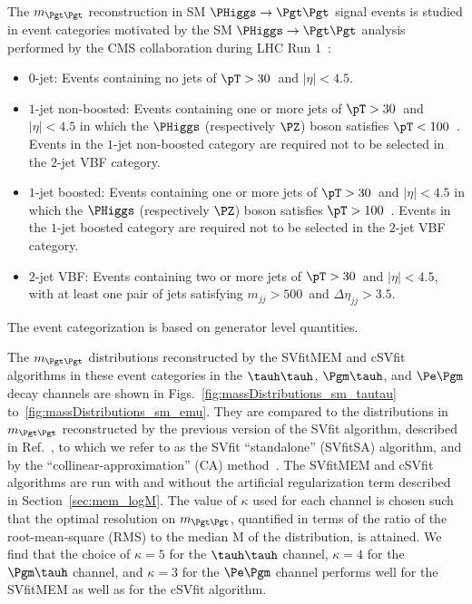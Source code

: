 The $m_{\Pgt\Pgt}$ reconstruction in SM $\PHiggs \to \Pgt\Pgt$ signal events is studied in event categories motivated by the
SM $\PHiggs \to \Pgt\Pgt$ analysis performed by the CMS collaboration during LHC Run $1$~\cite{HIG-13-004}:
\begin{itemize}
\item $0$-jet: 
  Events containing no jets of $\pT > 30$~\GeV and $\lvert \eta \rvert < 4.5$.
\item $1$-jet non-boosted:
  Events containing one or more jets of $\pT > 30$~\GeV and $\lvert \eta \rvert < 4.5$
  in which the $\PHiggs$ (respectively $\PZ$) boson satisfies $\pT < 100$~\GeV.
  Events in the $1$-jet non-boosted category are required not to be selected in the $2$-jet VBF category.
\item $1$-jet boosted:
  Events containing one or more jets of $\pT > 30$~\GeV and $\lvert \eta \rvert < 4.5$
  in which the $\PHiggs$ (respectively $\PZ$) boson satisfies $\pT > 100$~\GeV.
  Events in the $1$-jet boosted category are required not to be selected in the $2$-jet VBF category.
\item $2$-jet VBF:
  Events containing two or more jets of $\pT > 30$~\GeV and $\lvert \eta \rvert < 4.5$,
  with at least one pair of jets satisfying $m_{jj} > 500$~\GeV and $\Delta\eta_{jj} > 3.5$.
\end{itemize}
The event categorization is based on generator level quantities.

The $m_{\Pgt\Pgt}$ distributions reconstructed by the SVfitMEM and cSVfit algorithms in these event categories 
in the $\tauh\tauh$, $\Pgm\tauh$, and $\Pe\Pgm$ decay channels are shown in Figs.~\ref{fig:massDistributions_sm_tautau} to~\ref{fig:massDistributions_sm_emu}.
They are compared to the distributions in $m_{\Pgt\Pgt}$  reconstructed by the previous version of the
SVfit algorithm, described in Ref.~\cite{SVfit}, to which we refer to as the SVfit ``standalone'' (SVfitSA) algorithm,
and by the ``collinear-approximation'' (CA) method~\cite{massRecoCollinearApprox}.
The SVfitMEM and cSVfit algorithms are run with and without the artificial regularization term described in Section~\ref{sec:mem_logM}.
The value of $\kappa$ used for each channel is chosen such that the optimal resolution on $m_{\Pgt\Pgt}$, 
quantified in terms of the ratio of the root-mean-square (RMS) to the median $\textrm{M}$ of the distribution,
is attained.
We find that the choice of $\kappa = 5$ for the $\tauh\tauh$ channel, $\kappa = 4$ for the $\Pgm\tauh$ channel,
and $\kappa = 3$ for the $\Pe\Pgm$ channel performs well for the SVfitMEM as well as for the cSVfit algorithm.

